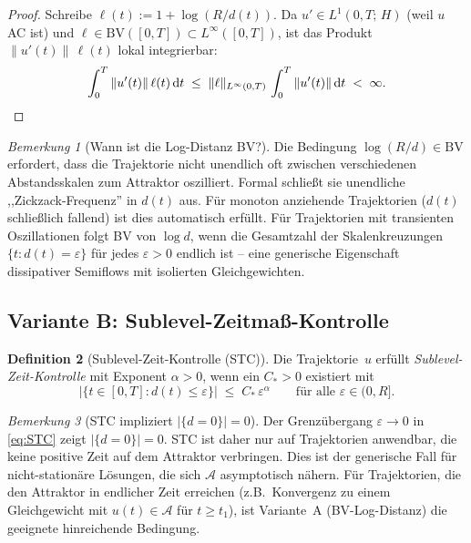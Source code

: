\documentclass[12pt,a4paper]{article}
\theoremstyle{definition}
\newtheorem{definition}{Definition}[section]
\theoremstyle{plain}
\theoremstyle{remark}
\newtheorem{remark}[definition]{Bemerkung}
\newcommand{\BV}{\mathrm{BV}}
\begin{document}
\begin{proof}
Schreibe $\ell(t) := 1 + \log(R/d(t))$.  Da $u' \in L^1(0,T;\,H)$
(weil $u$ AC ist) und $\ell \in \BV([0,T]) \subset
L^\infty([0,T])$, ist das Produkt
$\|u'(t)\|\,\ell(t)$ lokal integrierbar:
\[
  \int_0^T \|u'(t)\|\,\ell(t)\,\mathrm{d}t
  \;\le\;
  \|\ell\|_{L^\infty(0,T)}\,\int_0^T \|u'(t)\|\,\mathrm{d}t
  \;<\; \infty.  \qedhere
\]
\end{proof}

\begin{remark}[Wann ist die Log-Distanz BV?]
\label{rem:log-BV}
Die Bedingung $\log(R/d) \in \BV$ erfordert, dass die Trajektorie
nicht unendlich oft zwischen verschiedenen Abstandsskalen zum
Attraktor oszilliert.  Formal schließt sie unendliche
,,Zickzack-Frequenz'' in $d(t)$ aus.  Für monoton anziehende
Trajektorien ($d(t)$ schließlich fallend) ist dies automatisch
erfüllt.  Für Trajektorien mit transienten Oszillationen folgt
BV von $\log d$, wenn die Gesamtzahl der Skalenkreuzungen
$\{t : d(t) = \varepsilon\}$ für jedes
$\varepsilon > 0$ endlich ist -- eine generische Eigenschaft
dissipativer Semiflows mit isolierten Gleichgewichten.
\end{remark}

\subsection{Variante B: Sublevel-Zeitmaß-Kontrolle}

\begin{definition}[Sublevel-Zeit-Kontrolle (STC)]
\label{def:STC}
Die Trajektorie~$u$ erfüllt \emph{Sublevel-Zeit-Kontrolle} mit
Exponent $\alpha > 0$, wenn ein $C_* > 0$ existiert mit
\begin{equation}\label{eq:STC}
  \bigl|\{t \in [0,T] : d(t) \le \varepsilon\}\bigr|
  \;\le\;
  C_*\,\varepsilon^\alpha
  \qquad \text{für alle } \varepsilon \in (0, R].
\end{equation}
\end{definition}

\begin{remark}[STC impliziert \texorpdfstring{$|\{d=0\}| = 0$}{Mass von d=0 ist null}]
\label{rem:STC-d0}
Der Grenzübergang $\varepsilon \to 0$ in \eqref{eq:STC} zeigt
$|\{d = 0\}| = 0$.  STC ist daher nur auf Trajektorien anwendbar,
die keine positive Zeit auf dem Attraktor verbringen.  Dies ist der
generische Fall für nicht-stationäre Lösungen, die sich
$\mathcal{A}$ asymptotisch nähern.  Für Trajektorien, die den
Attraktor in endlicher Zeit erreichen (z.B.\ Konvergenz zu einem
Gleichgewicht mit $u(t) \in \mathcal{A}$ für $t \ge t_1$), ist
Variante~A (BV-Log-Distanz) die geeignete hinreichende Bedingung.
\end{remark}
\end{document}
